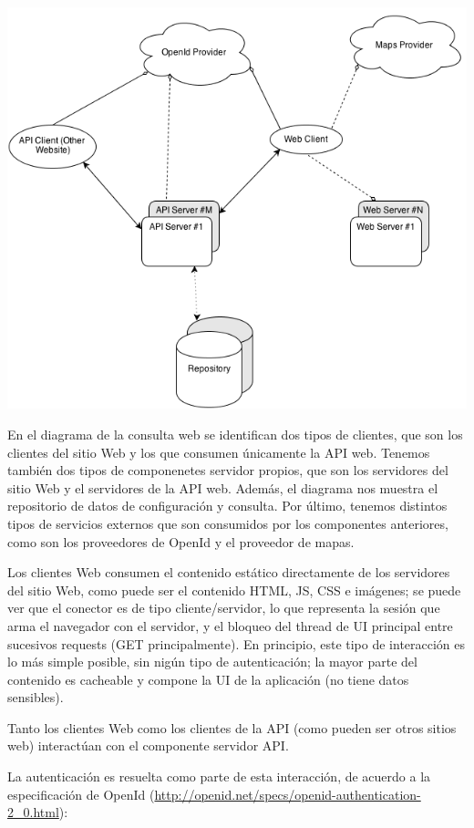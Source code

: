 \includegraphics[scale=0.5]{ISW2_cNc_Consulta}

En el diagrama de la consulta web se identifican dos tipos de clientes, que son los clientes del sitio Web y los que consumen \'unicamente la API web. Tenemos tambi\'en dos tipos de componenetes servidor propios, que son los servidores del sitio Web y el servidores de la API web. Adem\'as, el diagrama nos muestra el repositorio de datos de configuraci\'on y consulta. Por \'ultimo, tenemos distintos tipos de servicios externos que son consumidos por los componentes anteriores, como son los proveedores de OpenId y el proveedor de mapas.

Los clientes Web consumen el contenido est\'atico directamente de los servidores del sitio Web, como puede ser el contenido HTML, JS, CSS e im\'agenes; se puede ver que el conector es de tipo cliente/servidor, lo que representa la sesi\'on que arma el navegador con el servidor, y el bloqueo del thread de UI principal entre sucesivos requests (GET principalmente). En principio, este tipo de interacci\'on es lo m\'as simple posible, sin nig\'un tipo de autenticaci\'on; la mayor parte del contenido es cacheable y compone la UI de la aplicaci\'on (no tiene datos sensibles).

Tanto los clientes Web como los clientes de la API (como pueden ser otros sitios web) interact\'uan con el componente servidor API.

La autenticaci\'on es resuelta como parte de esta interacci\'on, de acuerdo a la especificaci\'on de OpenId (\url{http://openid.net/specs/openid-authentication-2_0.html}):

